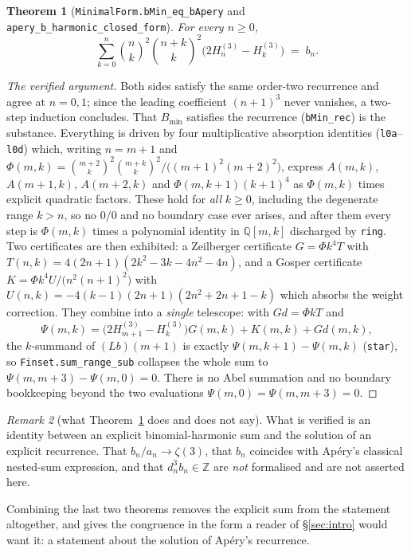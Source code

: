 \documentclass[11pt,reqno]{amsart}
\theoremstyle{plain}
\newtheorem{theorem}{Theorem}[section]
\theoremstyle{definition}
\theoremstyle{remark}
\newtheorem{remark}[theorem]{Remark}
\newcommand{\Z}{\mathbb{Z}}
\newcommand{\Q}{\mathbb{Q}}
\newcommand{\bin}[2]{\binom{#1}{#2}}
\newcommand{\HH}[2]{H^{(#1)}_{#2}}
\newcommand{\Ln}[1]{\texttt{#1}}
\numberwithin{equation}{section}
\begin{document}
\begin{theorem}[\Ln{MinimalForm.bMin\_eq\_bApery} and
\Ln{apery\_b\_harmonic\_closed\_form}]\label{thm:closed}
For every $n\ge0$,
\[
   \sum_{k=0}^{n}\bin nk^2\bin{n+k}k^2\bigl(2\HH3n-\HH3k\bigr)\;=\;b_n .
\]
\end{theorem}

\begin{proof}[The verified argument]
Both sides satisfy the same order-two recurrence and agree at $n=0,1$; since the leading
coefficient $(n+1)^3$ never vanishes, a two-step induction concludes. That $B_{\min}$
satisfies the recurrence (\Ln{bMin\_rec}) is the substance. Everything is driven by four
multiplicative absorption identities (\Ln{l0a}--\Ln{l0d}) which, writing $n=m+1$ and
$\Phi(m,k)=\bin{m+2}k^2\bin{m+k}k^2/\bigl((m+1)^2(m+2)^2\bigr)$, express $A(m,k)$,
$A(m+1,k)$, $A(m+2,k)$ and $\Phi(m,k+1)(k+1)^4$ as $\Phi(m,k)$ times explicit quadratic
factors. These hold for \emph{all} $k\ge0$, including the degenerate range $k>n$, so no
$0/0$ and no boundary case ever arises, and after them every step is $\Phi(m,k)$ times a
polynomial identity in $\Q[m,k]$ discharged by \Ln{ring}. Two certificates are then
exhibited: a Zeilberger certificate $G=\Phi k^4T$ with
$T(n,k)=4(2n+1)(2k^2-3k-4n^2-4n)$, and a Gosper certificate
$K=\Phi k^4U/\bigl(n^2(n+1)^2\bigr)$ with $U(n,k)=-4(k-1)(2n+1)(2n^2+2n+1-k)$ which absorbs
the weight correction. They combine into a \emph{single} telescope: with $Gd=\Phi kT$ and
\[
   \Psi(m,k)=\bigl(2\HH3{m+1}-\HH3k\bigr)G(m,k)+K(m,k)+Gd(m,k),
\]
the $k$-summand of $(Lb)(m+1)$ is exactly $\Psi(m,k+1)-\Psi(m,k)$ (\Ln{star}), so
\Ln{Finset.sum\_range\_sub} collapses the whole sum to $\Psi(m,m+3)-\Psi(m,0)=0$. There is no
Abel summation and no boundary bookkeeping beyond the two evaluations
$\Psi(m,0)=\Psi(m,m+3)=0$.
\end{proof}

\begin{remark}[what Theorem~\ref{thm:closed} does and does not say]\label{rem:closedscope}
What is verified is an identity between an explicit binomial-harmonic sum and the solution of
an explicit recurrence. That $b_n/a_n\to\zeta(3)$, that $b_n$ coincides with Ap\'ery's
classical nested-sum expression, and that $d_n^3b_n\in\Z$ are \emph{not} formalised and are
not asserted here.
\end{remark}

Combining the last two theorems removes the explicit sum from the statement altogether, and
gives the congruence in the form a reader of \S\ref{sec:intro} would want it: a statement
about the solution of Ap\'ery's recurrence.
\end{document}
